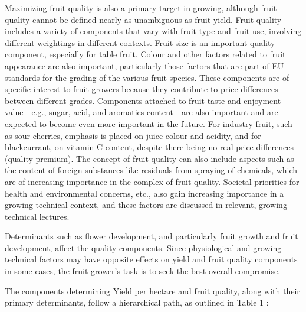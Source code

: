 \vspace{0.5em}
Maximizing fruit quality is also a primary target in growing, although fruit quality cannot be defined nearly as unambiguous as fruit yield. Fruit quality includes a variety of components that vary with fruit type and fruit use, involving different weightings in different contexts. Fruit size is an important quality component, especially for table fruit. Colour and other factors related to fruit appearance are also important, particularly those factors that are part of EU standards for the grading of the various fruit species. These components are of specific interest to fruit growers because they contribute to price differences between different grades. Components attached to fruit taste and enjoyment value—e.g., sugar, acid, and aromatics content—are also important and are expected to become even more important in the future. For industry fruit, such as sour cherries, emphasis is placed on juice colour and acidity, and for blackcurrant, on vitamin C content, despite there being no real price differences (quality premium). The concept of fruit quality can also include aspects such as the content of foreign substances like residuals from spraying of chemicals, which are of increasing importance in the complex of fruit quality. Societal priorities for health and environmental concerns, etc., also gain increasing importance in a growing technical context, and these factors are discussed in relevant, growing technical lectures.

\vspace{0.5em}
Determinants such as flower development, and particularly fruit growth and fruit development, affect the quality components. Since physiological and growing technical factors may have opposite effects on yield and fruit quality components in some cases, the fruit grower's task is to seek the best overall compromise.

\vspace{0.5em}
The components determining Yield per hectare and fruit quality, along with their primary determinants, follow a hierarchical path, as outlined in Table 1 \cite*{rm_01_L02_fruit_yield_quality}: 

